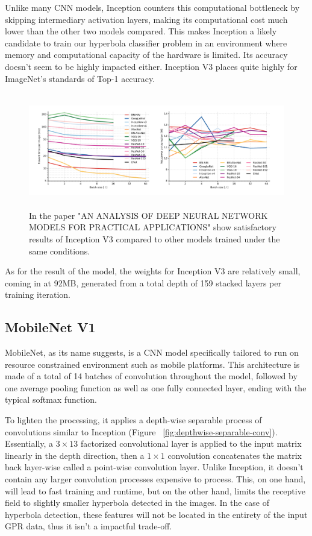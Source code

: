 \documentclass[se,blockletter]{uw-wkrpt}
\begin{document}
Unlike many CNN models, Inception counters this computational bottleneck by skipping intermediary activation layers, making its computational cost much lower than the other two models compared. This makes Inception a likely candidate to train our hyperbola classifier problem in an environment where memory and computational capacity of the hardware is limited. Its accuracy doesn't seem to be highly impacted either. Inception V3 places quite highly for ImageNet's standards of Top-1 accuracy. ~\cite{ref:Canziani_et_al}

\begin{figure}
  \centering
  \includegraphics[height=5cm]{forward-time-power-cons}
  \caption{In the paper "AN ANALYSIS OF DEEP NEURAL NETWORK MODELS
FOR PRACTICAL APPLICATIONS" show satisfactory results of Inception V3 compared to other models trained under the same conditions.~\cite{ref:Canziani_et_al}}
  \label{fig:forward-time-power-cons}
\end{figure}

As for the result of the model, the weights for Inception V3 are relatively small, coming in at 92MB, generated from a total depth of 159 stacked layers per training iteration.

\subsection{MobileNet V1}
MobileNet, as its name suggests, is a CNN model specifically tailored to run on resource constrained environment such as mobile platforms. This architecture is made of a total of 14 batches of convolution throughout the model, followed by one average pooling function as well as one fully connected layer, ending with the typical softmax function.

To lighten the processing, it applies a depth-wise separable process of convolutions similar to Inception (Figure ~\ref{fig:depthwise-separable-conv}). Essentially, a $3 \times 13$ factorized convolutional layer is applied to the input matrix linearly in the depth direction, then a $1 \times 1$ convolution concatenates the matrix back layer-wise called a point-wise convolution layer. Unlike Inception, it doesn't contain any larger convolution processes expensive to process. This, on one hand, will lead to fast training and runtime, but on the other hand, limits the receptive field to slightly smaller hyperbola detected in the images. In the case of hyperbola detection, these features will not be located in the entirety of the input GPR data, thus it isn't a impactful trade-off.
\end{document}
